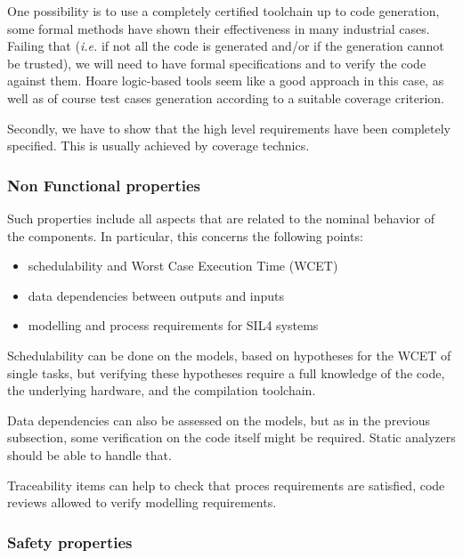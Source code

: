 \documentclass{template/openetcs_article}
\begin{document}
One possibility is to use a completely certified toolchain up
to code generation, some formal methods have shown their effectiveness in many industrial cases. Failing that ({\it i.e.} if not all the code is generated
and/or if the generation cannot be trusted), we will need to have formal
specifications and to verify the code against them. Hoare logic-based tools
seem like a good approach in this case, as well as of course test cases
generation according to a suitable coverage criterion.

Secondly, we have to  show that the high level requirements have been completely specified. This is usually  achieved by coverage technics. 

\subsubsection{Non Functional properties}

Such properties include all aspects that are related to the nominal behavior
of the components. In particular, this concerns the following points:
\begin{itemize}
\item schedulability and Worst Case Execution Time (WCET)
\item data dependencies between outputs and inputs
\item modelling and process requirements for SIL4 systems
\end{itemize}

Schedulability can be done on the models, based on hypotheses for the WCET of
single tasks, but verifying these hypotheses require a full knowledge of
the code, the underlying hardware, and the compilation toolchain.

Data dependencies can also be assessed on the models, but as in the previous
subsection, some verification on the code itself might be required. Static
analyzers should be able to handle that.

Traceability  items can help  to  check  that proces requirements are satisfied, code reviews allowed to  verify modelling requirements.

\subsubsection{Safety properties}
\end{document}
